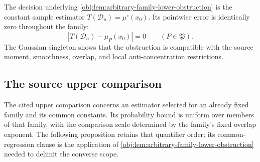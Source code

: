 \documentclass[11pt]{article}
\begin{document}
The decision underlying \cref{obj:lem:arbitrary-family-lower-obstruction} is the constant sample estimator \(T(\mathcal D_n)=\mu^\circ(x_0)\). Its pointwise error is identically zero throughout the family:
\[
|T(\mathcal D_n)-\mu_P(x_0)|=0
\qquad(P\in\mathfrak P).
\]
The Gaussian singleton shows that the obstruction is compatible with the source moment, smoothness, overlap, and local anti-concentration restrictions.

\subsection{The source upper comparison}

The cited upper comparison concerns an estimator selected for an already fixed family and its common constants. Its probability bound is uniform over members of that family, with the comparison scale determined by the family's fixed overlap exponent. The following proposition retains that quantifier order; its common-regression clause is the application of \cref{obj:lem:arbitrary-family-lower-obstruction} needed to delimit the converse scope.
\end{document}
